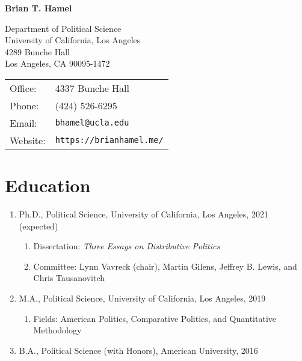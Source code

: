 \documentclass[12pt]{article}
\def\name{\textbf{Brian T. Hamel}}
\begin{document}
{\huge \name}


\vspace{0.25in}

\begin{minipage}{0.5\linewidth}
  Department of Political Science \\
  University of California, Los Angeles \\
  4289 Bunche Hall \\
  Los Angeles, CA 90095-1472 
\end{minipage}
\begin{minipage}{0.5\linewidth}
  \begin{tabular}{ll}
    Office: & 4337 Bunche Hall \\
    Phone: & (424) 526-6295 \\
    Email: & \texttt{bhamel@ucla.edu} \\
    Website: & \texttt{https://brianhamel.me/} \\
  \end{tabular}
\end{minipage}

\section*{Education}

\begin{enumerate}[topsep = 0pt, itemsep = 1ex, partopsep  = 1ex, parsep = 1ex]

	\item[] Ph.D., Political Science, University of California, Los Angeles, 2021 (expected)
	
	\begin{enumerate}[topsep = 0pt, itemsep = -1ex, partopsep = -1ex, parsep = 1ex]
	
		\item[] Dissertation: \textit{Three Essays on Distributive Politics}
		
		\item[] Committee: Lynn Vavreck (chair), Martin Gilens, Jeffrey B. Lewis, and Chris Tausanovitch
	
	\end{enumerate}
		
	\item[] M.A., Political Science, University of California, Los Angeles, 2019
	
	\begin{enumerate}[topsep = 0pt, itemsep = -1ex, partopsep  = -1ex, parsep = 1ex]
	
		\item[] Fields: American Politics, Comparative Politics, and Quantitative Methodology
	
	\end{enumerate}
		
	\item[] B.A., Political Science (with Honors), American University, 2016

\end{enumerate}
\end{document}
